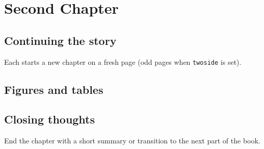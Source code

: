 \chapter{Second Chapter}
\label{ch:two}

\section{Continuing the story}
Each \verb|| starts a new chapter on a fresh page (odd pages when \texttt{twoside} is set).

\section{Figures and tables}

\section{Closing thoughts}
End the chapter with a short summary or transition to the next part of the book.
